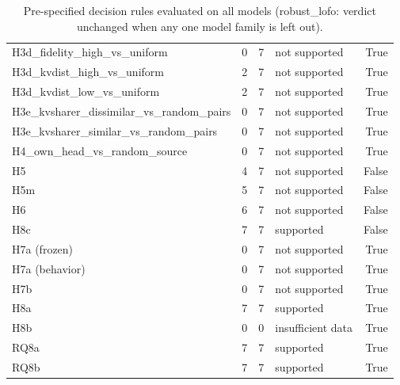 \begin{table}[t]
\begin{tabular}{lrrlr}
H3d\_fidelity\_high\_vs\_uniform & 0 & 7 & not supported & True \\
H3d\_kvdist\_high\_vs\_uniform & 2 & 7 & not supported & True \\
H3d\_kvdist\_low\_vs\_uniform & 2 & 7 & not supported & True \\
H3e\_kvsharer\_dissimilar\_vs\_random\_pairs & 0 & 7 & not supported & True \\
H3e\_kvsharer\_similar\_vs\_random\_pairs & 0 & 7 & not supported & True \\
H4\_own\_head\_vs\_random\_source & 0 & 7 & not supported & True \\
H5 & 4 & 7 & not supported & False \\
H5m & 5 & 7 & not supported & False \\
H6 & 6 & 7 & not supported & False \\
H8c & 7 & 7 & supported & False \\
H7a (frozen) & 0 & 7 & not supported & True \\
H7a (behavior) & 0 & 7 & not supported & True \\
H7b & 0 & 7 & not supported & True \\
H8a & 7 & 7 & supported & True \\
H8b & 0 & 0 & insufficient data & True \\
RQ8a & 7 & 7 & supported & True \\
RQ8b & 7 & 7 & supported & True \\
\bottomrule
\end{tabular}
\caption{Pre-specified decision rules evaluated on all models (robust\_lofo: verdict unchanged when any one model family is left out).}
\label{tab:decision_rules}
\end{table}
